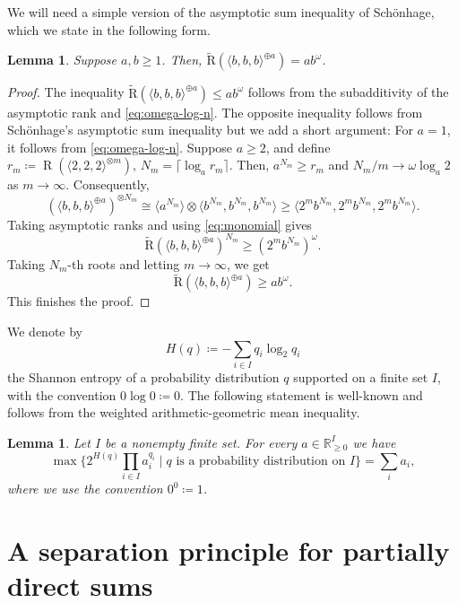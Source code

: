 \documentclass[11pt,letterpaper]{article}
\newtheorem{lemma}[theorem]{Lemma}\AddToHook{env/lemma/begin}{\crefalias{theorem}{lemma}}
\numberwithin{equation}{section}
\newcommand{\RR}{\mathbb{R}}
\newcommand{\ark}{\widetilde{\mathrm{R}}}
\DeclareMathOperator{\Rk}{\mathrm{R}}
\begin{document}
We will need a simple version of the asymptotic sum inequality of Sch\"onhage, which we state in the following form.

\begin{lemma}
\label{cor:asymptotic-rank-lower-bound}
Suppose $a,b\geq 1$. Then,
    $\ark\left(\langle b,b,b\rangle^{\oplus a}\right)=ab^{\omega}$.
\end{lemma}
\begin{proof}
The inequality $\ark(\langle b,b,b\rangle^{\oplus a})\leq ab^\omega$ follows from the subadditivity of the asymptotic rank and \cref{eq:omega-log-n}.
The opposite inequality follows from Sch\"{o}nhage's asymptotic sum inequality \cite{schonhage} but we add a short argument:
For $a=1$, it follows from \cref{eq:omega-log-n}.
Suppose $a\geq 2$, and define $r_m\coloneqq \Rk(\langle 2,2,2\rangle^{\otimes m}), \, N_m=\lceil \log_a r_m\rceil$.
Then, $a^{N_m}\geq r_m$ and $N_m/m\rightarrow \omega \log_a 2$ as $m\rightarrow \infty$.
Consequently,
\[
\left(\langle b,b,b\rangle^{\oplus a}\right)^{\otimes N_m}\cong \langle a^{N_m}\rangle\otimes \langle b^{N_m},b^{N_m},b^{N_m}\rangle\geq  \langle 2^{m}b^{N_m},2^{m}b^{N_m},2^{m}b^{N_m}\rangle.
\]
Taking asymptotic ranks and using \cref{eq:monomial} gives \[
\ark(\langle b,b,b\rangle^{\oplus a})^{N_m}\geq \left(2^m b^{N_m} \right)^\omega.
\]
Taking $N_m$-th roots and letting $m\rightarrow\infty$, we get \[
\ark(\langle b,b,b\rangle^{\oplus a}) \geq a b^{\omega}.
\] This finishes the proof.
\end{proof}


We denote by \[
H(q) \coloneqq -\sum_{i\in I} q_i\log_2 q_i
\]
the Shannon entropy of a probability distribution $q$ supported on a finite set $I$, with the convention $0\log 0\coloneqq 0$.
The following statement is well-known and follows from the weighted arithmetic-geometric mean inequality.

\begin{lemma}\label{lem:optimize-sum}
Let $I$ be a nonempty finite set.
  For every $a \in \RR_{\geq 0}^{I}$ we have
  \[ \max \{ 2^{H(q)} \prod_{i \in I} a_i^{q_i} \mid \text{$q$ is a probability distribution on $I$}\} = \sum_{i} a_i, \] where we use the convention $0^0 \coloneqq 1$.
\end{lemma}

\section{A separation principle for partially direct sums}
\end{document}
